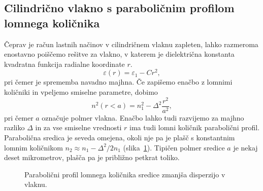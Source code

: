 \subsection*{Cilindrično vlakno s paraboličnim profilom lomnega količnika}
Čeprav je račun lastnih načinov v cilindričnem vlaknu zapleten, lahko 
razmeroma enostavno poiščemo rešitve za vlakno, v katerem je dielektrična 
konstanta kvadratna funkcija radialne koordinate $r$. 
\begin{equation}
\varepsilon (r) = \varepsilon_1 - C r^2,
\end{equation}
pri čemer je sprememba navadno majhna. Če zapišemo enačbo z lomnimi količniki
in vpeljemo smiselne parametre, dobimo
\begin{equation}
n^2\left(r<a\right)=n_{1}^{2}- \Delta^2 \frac{r^2}{a^2},
\label{9.15}
\end{equation}
pri čemer $a$ označuje polmer vlakna.
Enačbo lahko tudi razvijemo za majhno razliko $\Delta$ in za vse smiselne vrednosti $r$
ima tudi lomni količnik parabolični profil. Parabolična
sredica je seveda omejena, okoli nje pa je plašč s konstantnim
lomnim količnikom $n_2 \approx n_1-\Delta^2/2n_1$ (slika~\ref{fig:GRIN}). 
Tipičen polmer sredice $a$ je nekaj deset mikrometrov, plašča pa je približno petkrat toliko.
\begin{figure}[h]
\centering
\def\svgwidth{90truemm} 
 
\caption{Parabolični profil lomnega količnika sredice zmanjša disperzijo v vlaknu.}
\label{fig:GRIN}
\end{figure}

